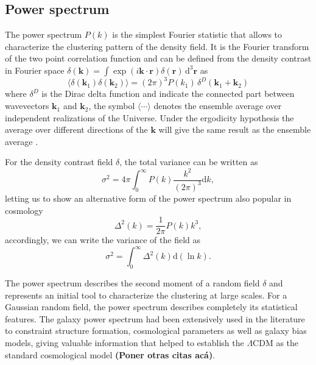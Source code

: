 \documentclass[a4paper,fleqn,usenatbib]{mnras}
\begin{document}
\subsection{Power spectrum}

The power spectrum $P(k)$ is the simplest Fourier statistic that allows to  
characterize the clustering pattern of the density field. It is the Fourier 
transform of the two point correlation function and can be defined from the 
density contrast in Fourier space $\delta(\mathbf{k}) = 
\int\exp(i\mathbf{k}\cdot\mathbf{r})\delta(\mathbf{r})\,\text{d}^3\mathbf{r}$ as
\begin{equation}
  \langle\delta(\mathbf{k}_1)\delta(\mathbf{k}_2)\rangle 
  = \left(2\pi\right)^3 P(k_1)\, \delta^D\left(\mathbf{k}_1+\mathbf{k}_2\right)
\end{equation}
where $\delta^D$ is the Dirac delta function and indicate the connected part 
between wavevectors $\mathbf{k}_1$ and $\mathbf{k}_2$, the symbol 
$\langle\cdots\rangle$
denotes the ensemble average over independent realizations of the Universe. 
Under the ergodicity hypothesis the average over different directions of the 
$\mathbf{k}$ will give the same result as the ensemble average 
\citep{GilMarin2012}.

For the density contrast field $\delta$, the total variance can be written as
\begin{equation}
  \sigma^2 = 4\pi \int_0^\infty P(k) \frac{k^2}{(2\pi)^3}\text{d}k,
\end{equation}
letting us to show an alternative form of the power spectrum also popular in 
cosmology
\begin{equation}
  \Delta^2(k) = \frac{1}{2\pi} P(k) k^3,
\end{equation}
accordingly, we can write the variance of the field as
\begin{equation}
  \sigma^2 = \int_0^\infty \Delta^2(k) \text{d}\left(\ln k\right).
\end{equation}

The power spectrum describes the second moment of a random field $\delta$ and 
represents an initial tool to characterize the clustering at large scales. For 
a Gaussian random field, the power spectrum describes completely its 
statistical features. The galaxy power spectrum had been extensively used in 
the literature to constraint structure formation, cosmological parameters as 
well as galaxy bias models, giving valuable information that helped to 
establish the $\Lambda$CDM as the standard cosmological model 
\citep{GilMarin2012} \textbf{(Poner otras citas ac\'a)}.
\end{document}
